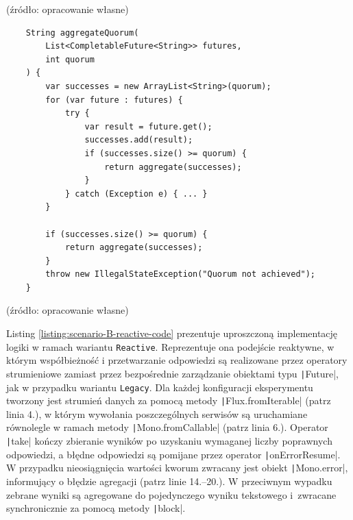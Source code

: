 \vspace{-20pt}
\begin{center}
    \small{(źródło: opracowanie własne)}
\end{center}

\newpage
\begin{listing}[!ht]
    \begin{verbatim}
    String aggregateQuorum(
        List<CompletableFuture<String>> futures,
        int quorum
    ) {
        var successes = new ArrayList<String>(quorum);
        for (var future : futures) {
            try {
                var result = future.get();
                successes.add(result);
                if (successes.size() >= quorum) {
                    return aggregate(successes);
                }
            } catch (Exception e) { ... }
        }

        if (successes.size() >= quorum) {
            return aggregate(successes);
        }
        throw new IllegalStateException("Quorum not achieved");
    }
    \end{verbatim}
    \caption{Metoda zawierająca właściwą logikę agregacji wyników w oparciu o~mechanizm kworum w ramach scenariusza $\mathcal{B}$ w wariancie \texttt{Legacy}}
    \label{listing:scenario-B-legacy-code-2}
\end{listing}

\vspace{-20pt}
\begin{center}
    \small{(źródło: opracowanie własne)}
\end{center}

Listing \ref{listing:scenario-B-reactive-code} prezentuje uproszczoną implementację logiki w ramach wariantu \texttt{Reactive}. Reprezentuje ona podejście reaktywne, w którym współbieżność i przetwarzanie odpowiedzi są realizowane przez operatory strumieniowe zamiast przez bezpośrednie zarządzanie obiektami typu \texttt|Future|, jak w przypadku wariantu \texttt{Legacy}. Dla każdej konfiguracji eksperymentu tworzony jest strumień danych za pomocą metody \texttt|Flux.fromIterable| (patrz linia 4.), w którym wywołania poszczególnych serwisów są uruchamiane równolegle w ramach metody \texttt|Mono.fromCallable| (patrz linia 6.). Operator \texttt|take| kończy zbieranie wyników po uzyskaniu wymaganej liczby poprawnych odpowiedzi, a błędne odpowiedzi są pomijane przez operator \texttt|onErrorResume|. W przypadku nieosiągnięcia wartości kworum zwracany jest obiekt \texttt|Mono.error|, informujący o błędzie agregacji (patrz linie 14.--20.).
W przeciwnym wypadku zebrane wyniki są agregowane do pojedynczego wyniku tekstowego i~zwracane synchronicznie za pomocą metody \texttt|block|.

